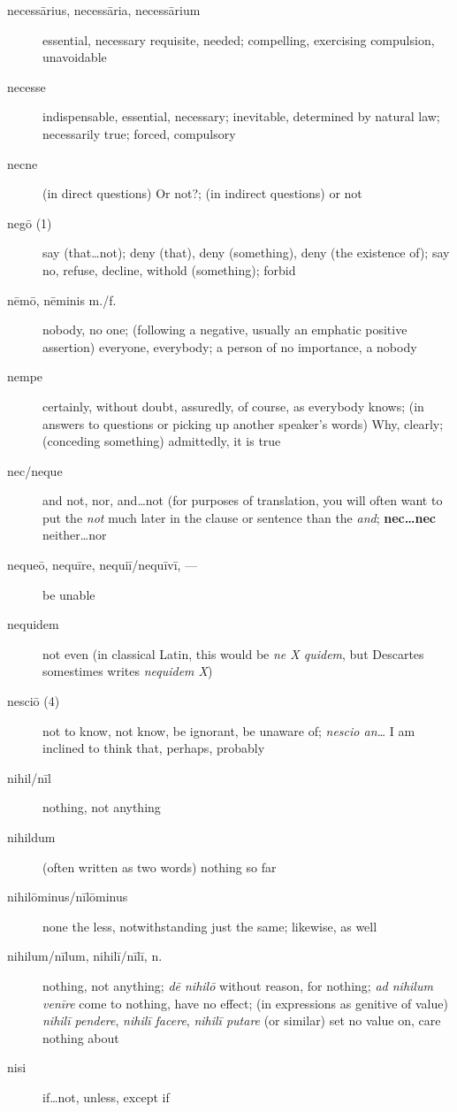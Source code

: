 \begin{description}
    \item[necessārius, necessāria, necessārium] essential, necessary requisite, needed; compelling, exercising compulsion, unavoidable
    \item[necesse] indispensable, essential, necessary; inevitable, determined by natural law; necessarily true; forced, compulsory
    \item[necne] (in direct questions) Or not?; (in indirect questions) or not
    \item[negō (1)] say (that\dots not); deny (that), deny (something), deny (the existence of); say no, refuse, decline, withold (something); forbid
    \item[nēmō, nēminis m./f.] nobody,  no one; (following a negative, usually an emphatic positive assertion) everyone, everybody; a person of no importance, a nobody
    \item[nempe] certainly, without doubt, assuredly, of course, as everybody knows; (in answers to questions or picking up another speaker's words) Why, clearly; (conceding something) admittedly, it is true
    \item[nec/neque] and not, nor, and\dots not (for purposes of translation, you will often want to put the \textit{not} much later in the clause or sentence than the \textit{and}; \textbf{nec\dots nec} neither\dots nor
    \item[nequeō, nequīre, nequiī/nequīvī, ---] be unable
    \item[nequidem] not even (in classical Latin, this would be \textit{ne X quidem}, but Descartes somestimes writes \textit{nequidem X})
    \item[nesciō (4)] not to know, not know, be ignorant, be unaware of; \textit{nescio an\dots} I am inclined to think that, perhaps, probably
    \item[nihil/nīl] nothing, not anything
    \item[nihildum] (often written as two words) nothing so far
    \item[nihilōminus/nīlōminus] none the less, notwithstanding just the same; likewise, as well
    \item[nihilum/nīlum, nihilī/nīlī, n.] nothing, not anything; \textit{dē nihilō} without reason, for nothing; \textit{ad nihilum venīre} come to nothing, have no effect; (in expressions as genitive of value) \textit{nihilī pendere}, \textit{nihilī facere}, \textit{nihilī putare} (or similar) set no value on, care nothing about
    \item[nisi] if\dots not, unless, except if

\end{description}

